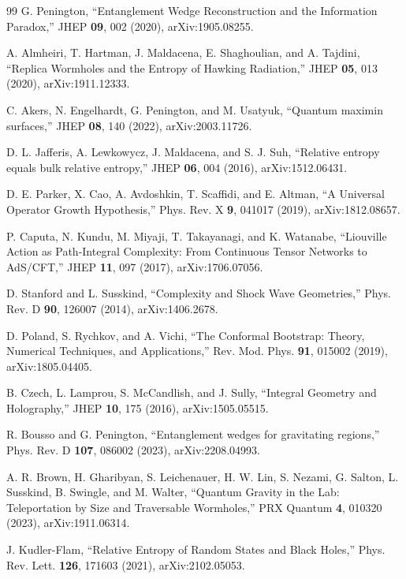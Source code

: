 \documentclass[12pt,a4paper]{article}
\begin{document}
\begin{thebibliography}{99}
G. Penington, ``Entanglement Wedge Reconstruction and the Information Paradox,'' JHEP \textbf{09}, 002 (2020), arXiv:1905.08255.

A. Almheiri, T. Hartman, J. Maldacena, E. Shaghoulian, and A. Tajdini, ``Replica Wormholes and the Entropy of Hawking Radiation,'' JHEP \textbf{05}, 013 (2020), arXiv:1911.12333.

C. Akers, N. Engelhardt, G. Penington, and M. Usatyuk, ``Quantum maximin surfaces,'' JHEP \textbf{08}, 140 (2022), arXiv:2003.11726.

D. L. Jafferis, A. Lewkowycz, J. Maldacena, and S. J. Suh, ``Relative entropy equals bulk relative entropy,'' JHEP \textbf{06}, 004 (2016), arXiv:1512.06431.

D. E. Parker, X. Cao, A. Avdoshkin, T. Scaffidi, and E. Altman, ``A Universal Operator Growth Hypothesis,'' Phys. Rev. X \textbf{9}, 041017 (2019), arXiv:1812.08657.

P. Caputa, N. Kundu, M. Miyaji, T. Takayanagi, and K. Watanabe, ``Liouville Action as Path-Integral Complexity: From Continuous Tensor Networks to AdS/CFT,'' JHEP \textbf{11}, 097 (2017), arXiv:1706.07056.

D. Stanford and L. Susskind, ``Complexity and Shock Wave Geometries,'' Phys. Rev. D \textbf{90}, 126007 (2014), arXiv:1406.2678.

D. Poland, S. Rychkov, and A. Vichi, ``The Conformal Bootstrap: Theory, Numerical Techniques, and Applications,'' Rev. Mod. Phys. \textbf{91}, 015002 (2019), arXiv:1805.04405.

B. Czech, L. Lamprou, S. McCandlish, and J. Sully, ``Integral Geometry and Holography,'' JHEP \textbf{10}, 175 (2016), arXiv:1505.05515.

R. Bousso and G. Penington, ``Entanglement wedges for gravitating regions,'' Phys. Rev. D \textbf{107}, 086002 (2023), arXiv:2208.04993.

A. R. Brown, H. Gharibyan, S. Leichenauer, H. W. Lin, S. Nezami, G. Salton, L. Susskind, B. Swingle, and M. Walter, ``Quantum Gravity in the Lab: Teleportation by Size and Traversable Wormholes,'' PRX Quantum \textbf{4}, 010320 (2023), arXiv:1911.06314.

J. Kudler-Flam, ``Relative Entropy of Random States and Black Holes,'' Phys. Rev. Lett. \textbf{126}, 171603 (2021), arXiv:2102.05053.


\end{thebibliography}
\end{document}
